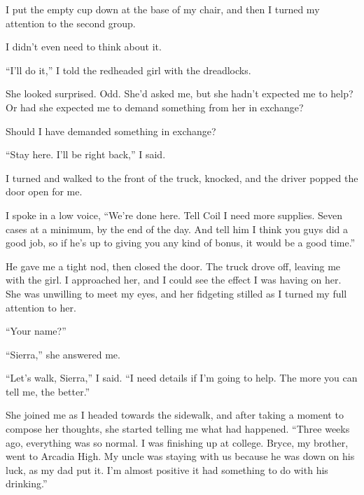 I put the empty cup down at the base of my chair, and then I turned my attention to the second group.



\sectionbreak



I didn't even need to think about it.



``I'll do it,'' I told the redheaded girl with the dreadlocks.



She looked surprised.  Odd.  She'd asked me, but she hadn't expected me to help?  Or had she expected me to demand something from her in exchange?



Should I have demanded something in exchange?



``Stay here.  I'll be right back,'' I said.



I turned and walked to the front of the truck, knocked, and the driver popped the door open for me.



I spoke in a low voice, ``We're done here.  Tell Coil I need more supplies.  Seven cases at a minimum, by the end of the day.  And tell him I think you guys did a good job, so if he's up to giving you any kind of bonus, it would be a good time.''



He gave me a tight nod, then closed the door.  The truck drove off, leaving me with the girl.  I approached her, and I could see the effect I was having on her.  She was unwilling to meet my eyes, and her fidgeting stilled as I turned my full attention to her.



``Your name?''



``Sierra,'' she answered me.



``Let's walk, Sierra,'' I said.  ``I need details if I'm going to help.  The more you can tell me, the better.''



She joined me as I headed towards the sidewalk, and after taking a moment to compose her thoughts, she started telling me what had happened.  ``Three weeks ago, everything was so normal.  I was finishing up at college.  Bryce, my brother, went to Arcadia High.  My uncle was staying with us because he was down on his luck, as my dad put it.  I'm almost positive it had something to do with his drinking.''




